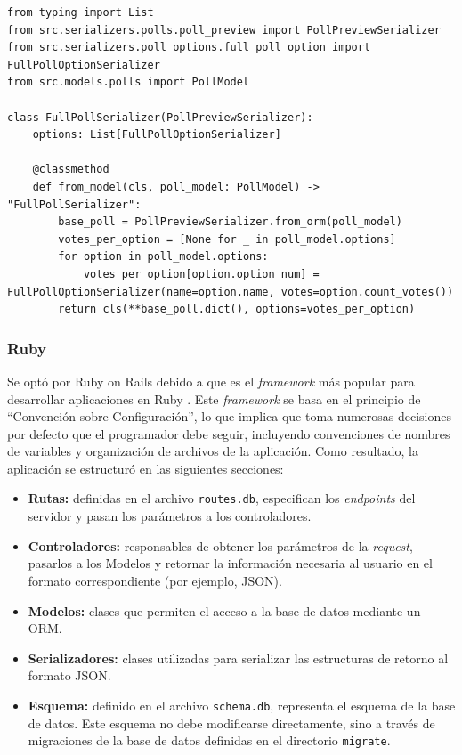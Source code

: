 \documentclass[11pt]{article}
\let\Oldsubsubsection\subsubsection
\renewcommand{\subsubsection}{\FloatBarrier\Oldsubsubsection}
\newcommand{\english}[1]{\textit{#1}}
\begin{document}
\begin{listing}[h]
\begin{verbatim}
from typing import List
from src.serializers.polls.poll_preview import PollPreviewSerializer
from src.serializers.poll_options.full_poll_option import FullPollOptionSerializer
from src.models.polls import PollModel

class FullPollSerializer(PollPreviewSerializer):
    options: List[FullPollOptionSerializer]

    @classmethod
    def from_model(cls, poll_model: PollModel) -> "FullPollSerializer":
        base_poll = PollPreviewSerializer.from_orm(poll_model)
        votes_per_option = [None for _ in poll_model.options]
        for option in poll_model.options:
            votes_per_option[option.option_num] = FullPollOptionSerializer(name=option.name, votes=option.count_votes())
        return cls(**base_poll.dict(), options=votes_per_option)
\end{verbatim}
\caption{Definición de un Serializador en Python, utilizando \lstinline{pydantic}}
\label{code:http:python_serializer}
\end{listing}

\subsubsection{Ruby}

Se optó por Ruby on Rails debido a que es el \english{framework} más popular para desarrollar aplicaciones en Ruby \cite{http:ruby_top_100}. Este \english{framework} se basa en el principio de ``Convención sobre Configuración'', lo que implica que toma numerosas decisiones por defecto que el programador debe seguir, incluyendo convenciones de nombres de variables y organización de archivos de la aplicación. Como resultado, la aplicación se estructuró en las siguientes secciones:

\begin{itemize}
    \item \textbf{Rutas:} definidas en el archivo \lstinline{routes.db}, especifican los \english{endpoints} del servidor y pasan los parámetros a los controladores.
    \item \textbf{Controladores:} responsables de obtener los parámetros de la \english{request}, pasarlos a los Modelos y retornar la información necesaria al usuario en el formato correspondiente (por ejemplo, JSON).
    \item \textbf{Modelos:} clases que permiten el acceso a la base de datos mediante un ORM.
    \item \textbf{Serializadores:} clases utilizadas para serializar las estructuras de retorno al formato JSON.
    \item \textbf{Esquema:} definido en el archivo \lstinline{schema.db}, representa el esquema de la base de datos. Este esquema no debe modificarse directamente, sino a través de migraciones de la base de datos definidas en el directorio \lstinline{migrate}.
\end{itemize}
\end{document}
